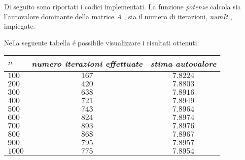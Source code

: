 \begin{center}
\large\noindent{}\end{center}
\noindent Di seguito sono riportati i codici implementati. La funzione \textit{potenze} calcola sia l'autovalore dominante della matrice \textit{A} , sia il numero di iterazioni, \textit{numIt }, impiegate.
\vspace{0.5cm}




\noindent Nella seguente tabella \'e possibile visualizzare i risultati ottenuti: 

\begin{center}
	\begin{tabular}{ | l | c | c |}
		\hline
		$n$ & \textit{numero iterazioni effettuate} & \textit{stima autovalore} \\ \hline
		$100$ & $167$ & $7.8224$ \\
		$200$ & $420$ & $7.8803$ \\
		$300$ & $638$ & $7.8916$ \\
		$400$ & $721$ & $7.8949$ \\
		$500$ & $743$ & $7.8964$ \\
		$600$ & $824$ & $7.8974$ \\
		$700$ & $893$ & $7.8976$ \\
		$800$ & $868$ & $7.8967$ \\
		$900$ & $795$ & $7.8957$ \\
		$1000$ & $775$ & $7.8954$ \\
		\hline
	\end{tabular}
\end{center}